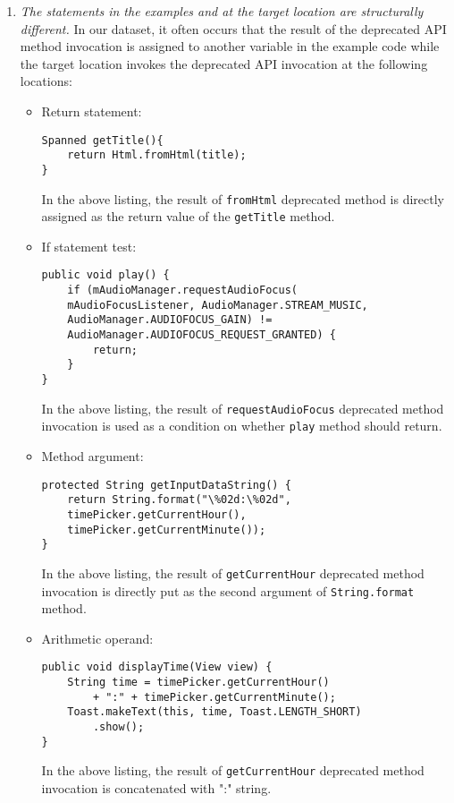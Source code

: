 \begin{enumerate}
\item {\em The statements in the examples and at the target location are
 structurally different.} In our dataset, it often occurs that the result
 of the deprecated API method invocation is assigned to another variable in
 the example code while the target location invokes the deprecated API
 invocation at the following locations:
\begin{itemize}
\item Return statement:
\begin{lstlisting}[language=text,numbers=none,caption=Invocation of a deprecated method in a return statement,captionpos=b, label=lst:invokeret]
Spanned getTitle(){
    return Html.fromHtml(title);
}
\end{lstlisting}
In the above listing, the result of {\tt fromHtml} deprecated method is directly assigned as the return value of the {\tt getTitle} method. 

\item If statement test:
\begin{lstlisting}[language=text,numbers=none,caption=Invocation of a deprecated method in an if statement,captionpos=b, label=lst:invokeif]
public void play() {
    if (mAudioManager.requestAudioFocus(
    mAudioFocusListener, AudioManager.STREAM_MUSIC,
    AudioManager.AUDIOFOCUS_GAIN) != 
    AudioManager.AUDIOFOCUS_REQUEST_GRANTED) {
        return;
    }
}
\end{lstlisting}
In the above listing, the result of {\tt requestAudioFocus} deprecated method invocation is used as a condition on whether {\tt play} method should return.
\item Method argument:
\begin{lstlisting}[language=text,numbers=none,caption=Invocation of a deprecated method in an method argument,captionpos=b, label=lst:invokemarg]
protected String getInputDataString() {
    return String.format("\%02d:\%02d", 
    timePicker.getCurrentHour(), 
    timePicker.getCurrentMinute());
}
\end{lstlisting}
In the above listing, the result of {\tt getCurrentHour} deprecated method invocation is directly put as the second argument of {\tt String.format} method.

\item Arithmetic operand:
\begin{lstlisting}[language=text,numbers=none,caption=Invocation of a deprecated method in an arithmetic operand,captionpos=b, label=lst:invokearit]
public void displayTime(View view) {
    String time = timePicker.getCurrentHour() 
	    + ":" + timePicker.getCurrentMinute();
    Toast.makeText(this, time, Toast.LENGTH_SHORT)
        .show();
}
\end{lstlisting}
In the above listing, the result of {\tt getCurrentHour} deprecated method invocation is concatenated with ":" string.
\end{itemize}


\end{enumerate}
